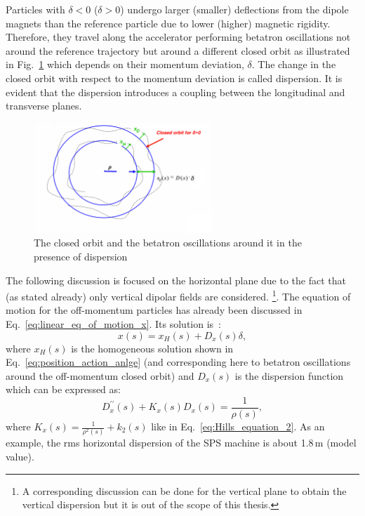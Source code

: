 Particles with $\delta < 0$ ($\delta>0$) undergo larger (smaller) deflections from the dipole magnets than the reference particle due to lower (higher) magnetic rigidity. Therefore, they travel along the accelerator performing betatron oscillations not around the reference trajectory but around a different closed orbit as illustrated in Fig.~\ref{fig:closed_orbit_Dx} which depends on their momentum deviation, $\delta$. The change in the closed orbit with respect to the momentum deviation is called dispersion. It is evident that the dispersion introduces a coupling between the longitudinal and transverse planes.

\begin{figure}[!h] %
    \centering         
    \includegraphics[width=0.6\textwidth]{images/Ch2/closed_orbit_dispersion.png}
        \caption{The closed orbit and the betatron oscillations around it in the presence of dispersion~\cite{Holzer_summer_students_introduction}}
        \label{fig:closed_orbit_Dx}
 \end{figure}

The following discussion is focused on the horizontal plane due to the fact that (as stated already) only vertical dipolar fields are considered. 
\footnote{A corresponding discussion can be done for the vertical plane to obtain the vertical dispersion but it is out of the scope of this thesis.}. The equation of motion for the off-momentum particles has already been discussed in Eq.~\eqref{eq:linear_eq_of_motion_x}. Its solution is~\cite{Lee:1425444}:
\begin{equation}
    x(s) = x_H(s) + D_x(s)\delta,
\end{equation}
where $x_H(s)$ is the homogeneous solution shown in Eq.~\eqref{eq:position_action_anlge} (and corresponding here to betatron oscillations around the off-momentum closed orbit) and $D_x(s)$ is the dispersion function which can be expressed as:
\begin{equation}\label{eq:dispersion_function}
    D^{\prime \prime}_x(s) + K_x(s)D_x(s) = \frac{1}{\rho(s)},
\end{equation}
where $K_x(s)= \frac{1}{\rho^2(s)}+k_2(s)$ like in Eq.~\eqref{eq:Hills_equation_2}. As an example, the rms horizontal dispersion of the SPS machine is about 1.8\,m (model value). %


